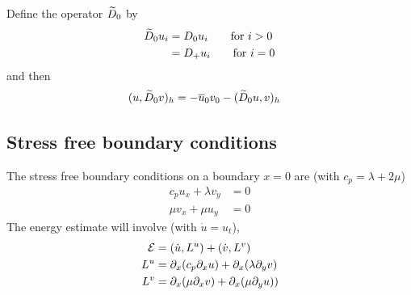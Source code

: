 Define the operator $\widetilde{D}_0$ by 
\begin{align}
  \widetilde{D}_0 u_i & =  D_0 u_i \qquad \text{for $i>0$}\\
          & = D_+ u_i \qquad \text{for $i=0$}
\end{align}
and then
\begin{align}
  (u, \widetilde{D}_0 v )_h &=  -\overline{u}_0 v_0 - (\widetilde{D}_0 u, v)_h \label{eq:dzip3} 
\end{align}

\clearpage
\subsection{Stress free boundary conditions}


\newcommand{\uy}{\partial_y u}
\newcommand{\vy}{\partial_y v}
\newcommand{\cp}{c_p}
\newcommand{\ut}{\dot{u}}
\newcommand{\vt}{\dot{v}}


The stress free boundary conditions on a boundary $x=0$ are (with $\cp=\lambda+2\mu$)
\begin{align*}
   \cp u_x + \lambda v_y &=0 \\
   \mu v_x + \mu u_y &=0 
\end{align*}
% 
The energy estimate will involve (with $\ut=u_t$), 
\begin{align*}
   \Ec &= (\ut ,L^u) + (\vt ,L^v) \\
   L^u & = \partial_x( \cp \partial_x u) + \partial_x(\lambda\partial_y v) \\
   L^v &= \partial_x( \mu\partial_x v) + \partial_x( \mu\partial_y u ))
\end{align*}

